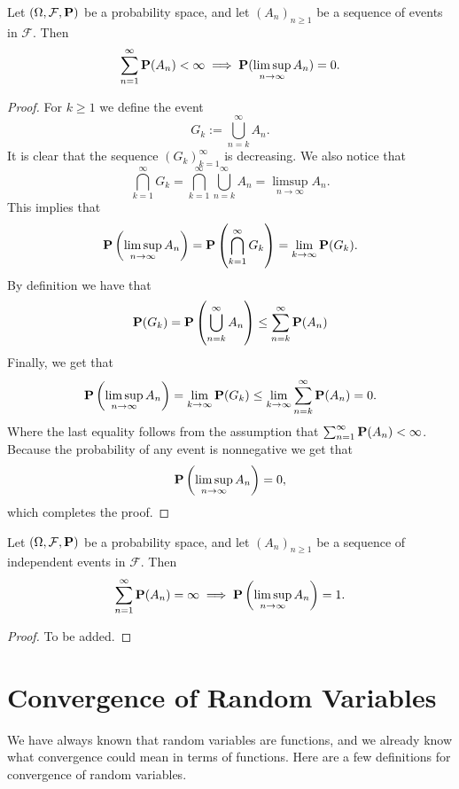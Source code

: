 \documentclass[11pt,a4paper]{article}
\begin{document}
  \begin{lemma}
    Let $(\Omega, \mathcal F, \mathbf{P})$ be a probability space, and let 
    $(A_n)_{n \geq 1}$ be a sequence of events in $\mathcal F$. Then
    \[
      \sum_{n=1}^{\infty} \mathbf{P}(A_n) < \infty \implies
      \mathbf{P}(\limsup_{n \to \infty} A_n) = 0.
    \]
  \end{lemma}
  \begin{proof}
    For $k \geq 1$ we define the event
    \[
      G_k := \bigcup_{n=k}^{\infty} A_n.
    \]
    It is clear that the sequence $(G_k)_{k=1}^{\infty}$ is decreasing.
    We also notice that
    \[
      \bigcap_{k=1}^{\infty} G_k =
      \bigcap_{k=1}^{\infty} \bigcup_{n=k}^{\infty} A_n =
      \limsup_{n \to \infty} A_n.
    \]
    This implies that
    \[
      \mathbf{P}\left(\limsup_{n \to \infty} A_n\right) =
      \mathbf{P}\left(\bigcap_{k=1}^{\infty} G_k\right) =
      \lim_{k \to \infty} \mathbf{P}(G_k).
    \]
    By definition we have that
    \[
      \mathbf{P}(G_k) =
      \mathbf{P}\left(\bigcup_{n=k}^{\infty} A_n\right) \le
      \sum_{n=k}^{\infty} \mathbf{P}(A_n)
    \]
    Finally, we get that
    \[
      \mathbf{P}\left(\limsup_{n \to \infty} A_n\right) =
      \lim_{k \to \infty} \mathbf{P}(G_k) \le
      \lim_{k \to \infty} \sum_{n=k}^{\infty} \mathbf{P}(A_n) =
      0.
    \]
    Where the last equality follows from the assumption that
    $\sum_{n=1}^{\infty} \mathbf{P}(A_n) < \infty$.
    Because the probability of any event is nonnegative we get that
    \[
      \mathbf{P}\left(\limsup_{n \to \infty} A_n\right) = 0,
    \]
    which completes the proof.
  \end{proof}

  \begin{example}
    
  \end{example}

  \begin{lemma}
    Let $(\Omega, \mathcal F, \mathbf{P})$ be a probability space, and let
    $(A_n)_{n \geq 1}$ be a sequence of independent events in $\mathcal F$.
    Then
    \[
      \sum_{n=1}^{\infty} \mathbf{P}(A_n) = \infty \implies
      \mathbf{P}\left(\limsup_{n \to \infty} A_n\right) = 1.
    \]
  \end{lemma}
  
  \begin{proof}
    To be added.
  \end{proof}

  \newpage
  
  \section{Convergence of Random Variables}
  We have always known that random variables are functions,
  and we already know what convergence could mean in terms of functions.
  Here are a few definitions for convergence of random variables.
\end{document}
